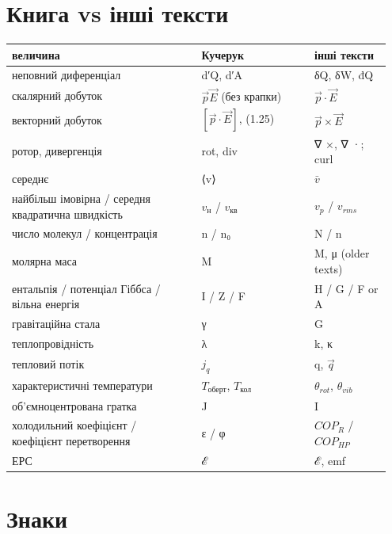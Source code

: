 \documentclass[11pt,a4paper,oneside]{book}
\begin{document}
\section*{Книга vs інші тексти}

{\small
\begin{longtable}{>{\raggedright\arraybackslash}p{0.476\linewidth}>{\raggedright\arraybackslash}p{0.282\linewidth}>{\raggedright\arraybackslash}p{0.194\linewidth}}
\toprule
\textbf{величина} & \textbf{Кучерук} & \textbf{інші тексти} \\
\midrule
\endhead
неповний диференціал & d′Q, d′A & δQ, δW, đQ \\
скалярний добуток & $\vec p\vec E$ (без крапки) & $\vec p\cdot\vec E$ \\
векторний добуток & $[\vec p\cdot\vec E]$, (1.25) & $\vec p\times\vec E$ \\
ротор, дивергенція & rot, div & ∇ ×, ∇ ·; curl \\
середнє & ⟨v⟩ & $\bar v$ \\
найбільш імовірна / середня квадратична швидкість & $v_\text{н}$ / $v_{\text{кв}}$ & $v_p$ / $v_{rms}$ \\
число молекул / концентрація & n / n₀ & N / n \\
молярна маса & M & M, μ (older texts) \\
ентальпія / потенціал Гіббса / вільна енергія & I / Z / F & H / G / F or A \\
гравітаційна стала & γ & G \\
теплопровідність & λ & k, κ \\
тепловий потік & $j_q$ & q, $\vec q$ \\
характеристичні температури & $T_{\text{оберт}}$, $T_{\text{кол}}$ & $θ_{rot}$, $θ_{vib}$ \\
об'ємноцентрована гратка & J & I \\
холодильний коефіцієнт / коефіцієнт перетворення & ε / φ & $COP_{R}$ / $COP_{HP}$ \\
ЕРС & ℰ & ℰ, emf \\
\bottomrule
\end{longtable}
}

\section*{Знаки}
\end{document}
